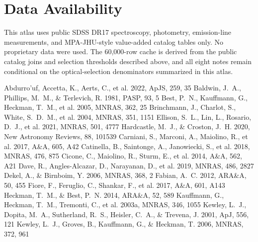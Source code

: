 \documentclass[twocolumn]{aastex631}
\begin{document}
\section*{Data Availability}
This atlas uses public SDSS DR17 spectroscopy, photometry, emission-line measurements, and MPA-JHU-style value-added catalog tables only. No proprietary data were used. The 60,000-row cache is derived from the public catalog joins and selection thresholds described above, and all eight notes remain conditional on the optical-selection denominators summarized in this atlas.


\begin{thebibliography}{}
 Abdurro'uf, Accetta, K., Aerts, C., et al. 2022, ApJS, 259, 35
 Baldwin, J.~A., Phillips, M.~M., \& Terlevich, R. 1981, PASP, 93, 5
 Best, P.~N., Kauffmann, G., Heckman, T.~M., et al. 2005, MNRAS, 362, 25
 Brinchmann, J., Charlot, S., White, S.~D.~M., et al. 2004, MNRAS, 351, 1151
 Ellison, S.~L., Lin, L., Rosario, D.~J., et al. 2021, MNRAS, 501, 4777
 Hardcastle, M.~J., \& Croston, J.~H. 2020, New Astronomy Reviews, 88, 101539
 Carniani, S., Marconi, A., Maiolino, R., et al. 2017, A\&A, 605, A42
 Catinella, B., Saintonge, A., Janowiecki, S., et al. 2018, MNRAS, 476, 875
 Cicone, C., Maiolino, R., Sturm, E., et al. 2014, A\&A, 562, A21
 Dave, R., Angles-Alcazar, D., Narayanan, D., et al. 2019, MNRAS, 486, 2827
 Dekel, A., \& Birnboim, Y. 2006, MNRAS, 368, 2
 Fabian, A.~C. 2012, ARA\&A, 50, 455
 Fiore, F., Feruglio, C., Shankar, F., et al. 2017, A\&A, 601, A143
 Heckman, T.~M., \& Best, P.~N. 2014, ARA\&A, 52, 589
 Kauffmann, G., Heckman, T.~M., Tremonti, C., et al. 2003a, MNRAS, 346, 1055
 Kewley, L.~J., Dopita, M.~A., Sutherland, R.~S., Heisler, C.~A., \& Trevena, J. 2001, ApJ, 556, 121
 Kewley, L.~J., Groves, B., Kauffmann, G., \& Heckman, T. 2006, MNRAS, 372, 961

\end{thebibliography}
\end{document}
